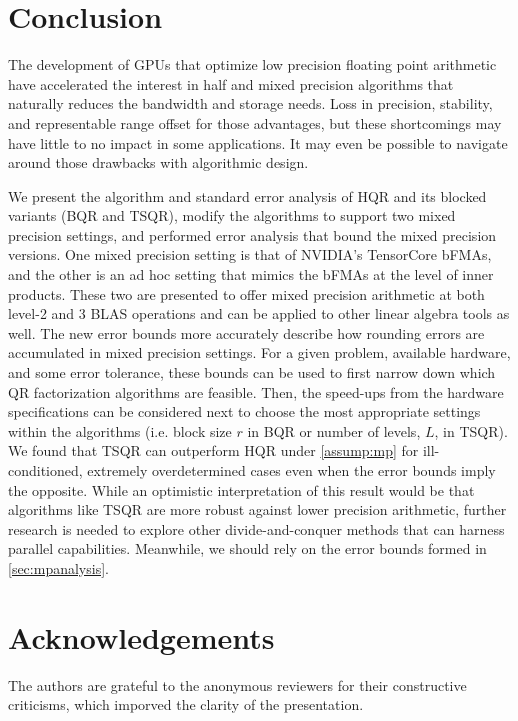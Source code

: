 \documentclass[review,onefignum,onetabnum]{siamart190516}
\begin{document}
\section{Conclusion}
The development of GPUs that optimize low precision floating point arithmetic have accelerated the interest in half and mixed precision algorithms that naturally reduces the bandwidth and storage needs. 
Loss in precision, stability, and representable range offset for those advantages, but these shortcomings may have little to no impact in some applications.
It may even be possible to navigate around those drawbacks with algorithmic design. \par
We present the algorithm and standard error analysis of HQR and its blocked variants (BQR and TSQR), modify the algorithms to support two mixed precision settings, and performed error analysis that bound the mixed precision versions.
One mixed precision setting is that of NVIDIA's TensorCore bFMAs, and the other is an ad hoc setting that mimics the bFMAs at the level of inner products.
These two are presented to offer mixed precision arithmetic at both level-2 and 3 BLAS operations and can be applied to other linear algebra tools as well.
The new error bounds more accurately describe how rounding errors are accumulated in mixed precision settings.
For a given problem, available hardware, and some error tolerance, these bounds can be used to first narrow down which QR factorization algorithms are feasible. 
Then, the speed-ups from the hardware specifications can be considered next to choose the most appropriate settings within the algorithms (i.e. block size $r$ in BQR or number of levels, $L$, in TSQR).
We found that TSQR can outperform HQR under \cref{assump:mp} for ill-conditioned, extremely overdetermined cases even when the error bounds imply the opposite.
While an optimistic interpretation of this result would be that algorithms like TSQR are more robust against lower precision arithmetic, further research is needed to explore other divide-and-conquer methods that can harness parallel capabilities.
Meanwhile, we should rely on the error bounds formed in \cref{sec:mpanalysis}.
\section*{Acknowledgements}
The authors are grateful to the anonymous reviewers for their constructive criticisms, which imporved the clarity of the presentation.

\end{document}
